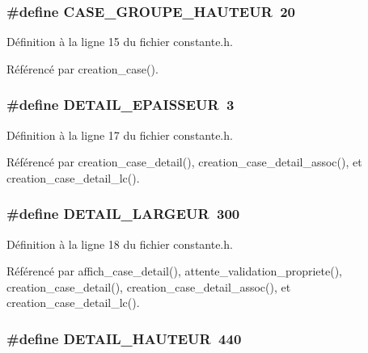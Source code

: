 \subsubsection{\setlength{\rightskip}{0pt plus 5cm}\#define CASE\_\-GROUPE\_\-HAUTEUR~20}\label{constante_8h_16ca0af12168d5c6f926e0600d9cf533}




D\'{e}finition \`{a} la ligne 15 du fichier constante.h.

R\'{e}f\'{e}renc\'{e} par creation\_\-case().
\subsubsection{\setlength{\rightskip}{0pt plus 5cm}\#define DETAIL\_\-EPAISSEUR~3}\label{constante_8h_3434ead01c4c772fe79eca38084bdf78}




D\'{e}finition \`{a} la ligne 17 du fichier constante.h.

R\'{e}f\'{e}renc\'{e} par creation\_\-case\_\-detail(), creation\_\-case\_\-detail\_\-assoc(), et creation\_\-case\_\-detail\_\-lc().
\subsubsection{\setlength{\rightskip}{0pt plus 5cm}\#define DETAIL\_\-LARGEUR~300}\label{constante_8h_d50f87d71f19206172a940fd8b809a7a}




D\'{e}finition \`{a} la ligne 18 du fichier constante.h.

R\'{e}f\'{e}renc\'{e} par affich\_\-case\_\-detail(), attente\_\-validation\_\-propriete(), creation\_\-case\_\-detail(), creation\_\-case\_\-detail\_\-assoc(), et creation\_\-case\_\-detail\_\-lc().
\subsubsection{\setlength{\rightskip}{0pt plus 5cm}\#define DETAIL\_\-HAUTEUR~440}\label{constante_8h_265b71a9283e151abfccd3ae1a30f2f7}




